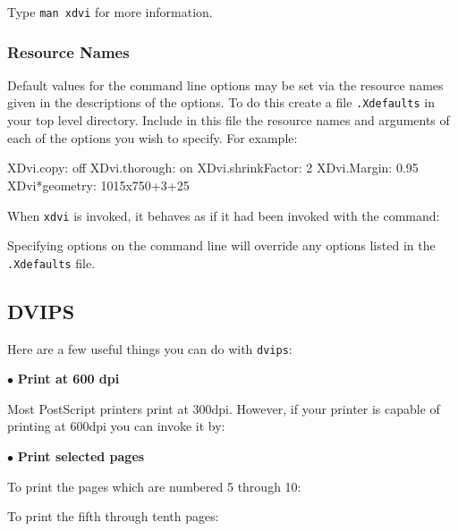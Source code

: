\documentclass[11pt,twoside,nolof]{starlink}
\begin{document}
Type \texttt{man xdvi} for more information.

\subsubsection{Resource Names}

Default values for the command line options may be set via the resource names
given in the descriptions of the options. To do this
create a file \texttt{.Xdefaults} in your top level directory.
Include in this file the resource names
and arguments of each of the options you wish to specify.  For example:
\begin{terminalv}
XDvi.copy: off
XDvi.thorough: on
XDvi.shrinkFactor: 2
XDvi.Margin: 0.95
XDvi*geometry: 1015x750+3+25
\end{terminalv}
   When \verb+xdvi+ is invoked, it behaves as if it had been invoked with the
   command:
\begin{terminalv}
\end{terminalv}
   Specifying options on the command line will override any options listed
   in the \texttt{.Xdefaults} file.

\subsection{DVIPS}

Here are a few useful things you can do with \texttt{dvips}:

$\bullet$ \textbf{Print at 600 dpi}

Most PostScript printers print at 300dpi.  However,
if your printer is capable of printing at 600dpi you can invoke it by:
\begin{terminalv}
\end{terminalv}

$\bullet$ \textbf{Print selected pages}

To print the pages which are numbered 5 through 10:

\begin{terminalv}
\end{terminalv}

To print the fifth through tenth pages:

\begin{terminalv}
\end{terminalv}
\end{document}
